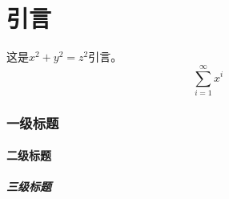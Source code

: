 \part*{引言}
这是$ x^2+y^2=z^2 $引言。\[ \sum_{i=1}^{\infty}x^i \]
\section{一级标题}
\subsection{二级标题}
\subsubsection{三级标题}
